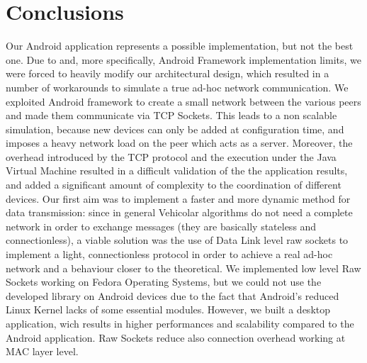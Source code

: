 \section{Conclusions}
	Our Android application represents a possible implementation, but not the best one. Due to \direct and, more specifically, Android \direct Framework implementation limits, we were forced to heavily modify our architectural design, which resulted in a number of workarounds to simulate a true ad-hoc network communication. We exploited Android \direct framework to create a small network between the various peers and made them communicate via TCP Sockets. This leads to a non scalable simulation, because new devices can only be added at configuration time, and imposes a heavy network load on the peer which acts as a server.
	Moreover, the overhead introduced by the TCP protocol and the execution under the Java Virtual Machine resulted in a difficult validation of the the application results, and added a significant amount of complexity to the coordination of different devices.
	Our first aim was to implement a faster and more dynamic method for data transmission: since in general Vehicolar algorithms do not need a complete network in order to exchange messages (they are basically stateless and connectionless), a viable solution was the use of Data Link level raw sockets to implement a light, connectionless protocol in order to achieve a real ad-hoc network and a behaviour closer to the theoretical. We implemented low level Raw Sockets working on Fedora Operating Systems, but we could not use the developed library on Android devices due to the fact that Android's reduced Linux Kernel lacks of some essential modules. However, we built a desktop application, wich results in higher performances and scalability compared to the Android application. Raw Sockets reduce also connection overhead working at MAC layer level.


